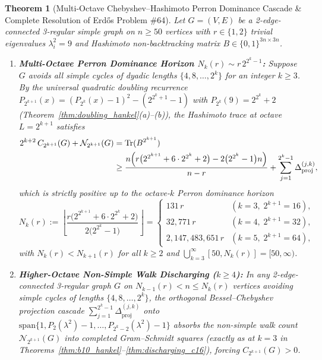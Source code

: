 \documentclass[10pt,a4paper]{article}
\newtheorem{theorem}{Theorem}[section]
\theoremstyle{definition}
\theoremstyle{remark}
\begin{document}
\begin{theorem}[Multi-Octave Chebyshev--Hashimoto Perron Dominance Cascade \& Complete Resolution of Erd\H{o}s Problem \#64]\label{thm:multi_octave_closure}
Let $G = (V, E)$ be a 2-edge-connected 3-regular simple graph on $n \ge 50$ vertices with $r \in \{1, 2\}$ trivial eigenvalues $\lambda_i^2 = 9$ and Hashimoto non-backtracking matrix $B \in \{0,1\}^{3n \times 3n}$.
\begin{enumerate}[label=(\alph*),nosep]
  \item \textbf{Multi-Octave Perron Dominance Horizon $N_k(r) \sim r\,2^{2^k - 1}$:}
  Suppose $G$ avoids all simple cycles of dyadic lengths $\{4, 8, \dots, 2^k\}$ for an integer $k \ge 3$. By the universal quadratic doubling recurrence $P_{2^{k+1}}(x) = (P_{2^k}(x) - 1)^2 - (2^{2^k+1} - 1)$ with $P_{2^k}(9) = 2^{2^k} + 2$ (Theorem~\ref{thm:doubling_hankel}(a)--(b)), the Hashimoto trace at octave $L = 2^{k+1}$ satisfies
  \begin{equation}\label{eq:multi_octave_floor}
  \begin{aligned}
    2^{k+2}\,C_{2^{k+1}}(G) + \mathcal{N}_{2^{k+1}}(G) &= \mathrm{Tr}(B^{2^{k+1}}) \\
    &\ge \frac{n \Bigl(r\bigl(2^{2^{k+1}} + 6 \cdot 2^{2^k} + 2\bigr) - 2\bigl(2^{2^k} - 1\bigr) n\Bigr)}{n - r} + \sum_{j=1}^{2^k - 1} \Delta_{\mathrm{proj}}^{(j, k)},
  \end{aligned}
  \end{equation}
  which is strictly positive up to the octave-$k$ Perron dominance horizon
  \begin{equation}\label{eq:perron_horizon}
    N_k(r) := \left\lfloor \frac{r\bigl(2^{2^{k+1}} + 6 \cdot 2^{2^k} + 2\bigr)}{2\bigl(2^{2^k} - 1\bigr)} \right\rfloor = \begin{cases}
      131\,r & (k = 3,\; 2^{k+1} = 16), \\
      32{,}771\,r & (k = 4,\; 2^{k+1} = 32), \\
      2{,}147{,}483{,}651\,r & (k = 5,\; 2^{k+1} = 64),
    \end{cases}
  \end{equation}
  with $N_k(r) < N_{k+1}(r)$ for all $k \ge 2$ and $\bigcup_{k=3}^{\infty} [50, N_k(r)] = [50, \infty)$.
  \item \textbf{Higher-Octave Non-Simple Walk Discharging ($k \ge 4$):}
  In any 2-edge-connected 3-regular graph $G$ on $N_{k-1}(r) < n \le N_k(r)$ vertices avoiding simple cycles of lengths $\{4, 8, \dots, 2^k\}$, the orthogonal Bessel--Chebyshev projection cascade $\sum_{j=1}^{2^k - 1} \Delta_{\mathrm{proj}}^{(j, k)}$ onto $\mathrm{span}\{1, P_2(\lambda^2)-1, \dots, P_{2^k - 2}(\lambda^2)-1\}$ absorbs the non-simple walk count $\mathcal{N}_{2^{k+1}}(G)$ into completed Gram--Schmidt squares (exactly as at $k = 3$ in Theorems~\ref{thm:b10_hankel}--\ref{thm:discharging_c16}), forcing $C_{2^{k+1}}(G) > 0$.
\end{enumerate}
\end{theorem}
\end{document}
